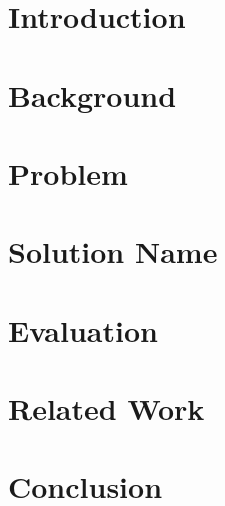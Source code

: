 \documentclass[sigconf]{acmart}
\begin{document}



\maketitle

\section{Introduction}
\label{sec:intro}


\section{Background}
\label{sec:background}
 


\section{Problem}
\label{sec:design_space}

 
\section{Solution Name}
\label{sec:solution}


% 

\section{Evaluation}
\label{sec:experimental_results}


\section{Related Work}
\label{sec:related_work}

 
\section{Conclusion}
\label{sec:conclusion}



\balance 
{
 
} 
\end{document}
